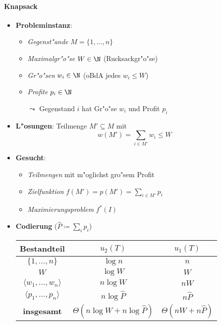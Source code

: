 \paragraph{Knapsack}
\begin{itemize}
  \item \textbf{Probleminstanz}:
  \begin{itemize}
    \item \emph{Gegenst"ande} $ M = \{ 1,\dots,n \} $ 
    \item \emph{Maximalgr"o"se} $ W \in \N $ (Rucksackgr"o"se)
    \item \emph{Gr"o"sen} $ w_i \in \N $ (oBdA jedes $ w_i \leq W $)
    \item \emph{Profite} $ p_i \in \N $
    \item[$ \leadsto $] Gegenstand $ i $ hat Gr"o"se $ w_i $ und Profit $ p_i $
  \end{itemize}
  \item \textbf{L"osungen}: Teilmenge $ M' \subseteq M $ mit
    \begin{equation*}
      w(M') = \textstyle\sum_{i \in M'}w_i \leq W
    \end{equation*}
  \item \textbf{Gesucht}:
  \begin{itemize}
    \item \emph{Teilmengen} mit m"oglichst gro"sem Profit
    \item \emph{Zielfunktion} $ f(M') = p(M') = \sum_{i \in M'}p_i $
    \item \emph{Maximierungsproblem} $ f^*(I) $
  \end{itemize}
  \item \textbf{Codierung} ($ \hat{P} \coloneqq \sum_i p_i $)
  \begin{center}
    \begin{tabular}{ c c c } 
      \hline    
      Bestandteil & $ u_2(T) $ & $ u_1(T) $ \\
      \hline
      $ \{ 1,\dots,n \} $ & $ \log n $ & $ n $ \\
      $ W $ & $ \log W $ & $ W $ \\
      $ \langle w_1, \dots, w_n \rangle $ & $ n\log W $ & $ nW $ \\
      $ \langle p_1, \dots, p_n \rangle $ & $ n\log \hat{P} $ & $ n \hat{P} $ \\
      \hline
      \textbf{insgesamt} & $ \Theta(n\log W + n\log \hat{P}) $ & $ \Theta(nW + n\hat{P}) $
    \end{tabular}
  \end{center}

\end{itemize}
